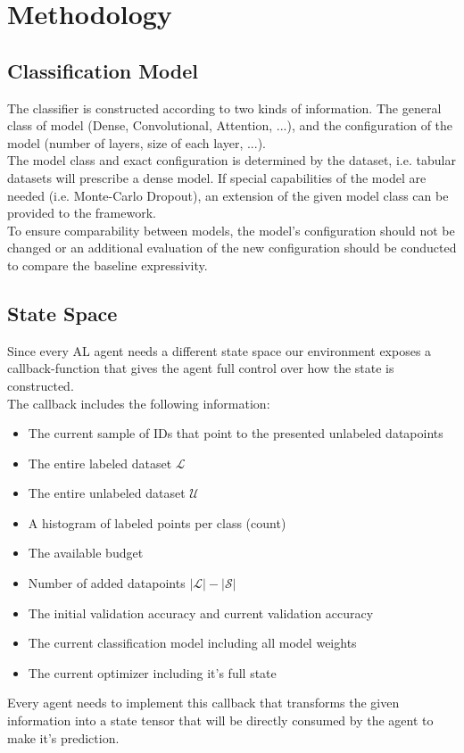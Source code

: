 \documentclass[]{article}
\begin{document}
\section{Methodology}

\subsection{Classification Model}
The classifier is constructed according to two kinds of information.
The general class of model (Dense, Convolutional, Attention, ...), and the configuration of the model (number of layers, size of each layer, ...). \\
The model class and exact configuration is determined by the dataset, i.e. tabular datasets will prescribe a dense model.
If special capabilities of the model are needed (i.e. Monte-Carlo Dropout), an extension of the given model class can be provided to the framework. \\ [1mm]
To ensure comparability between models, the model's configuration should not be changed or an additional evaluation of the new configuration should be conducted to compare the baseline expressivity.

\subsection{State Space}
Since every AL agent needs a different state space our environment exposes a callback-function that gives the agent full control over how the state is constructed. \\ [1mm]
The callback includes the following information:
\begin{itemize}
	\item The current sample of IDs that point to the presented unlabeled datapoints
	\item The entire labeled dataset $\mathcal{L}$
	\item The entire unlabeled dataset $\mathcal{U}$
	\item A histogram of labeled points per class (count)
	\item The available budget
	\item Number of added datapoints $|\mathcal{L}| - |\mathcal{S}|$
	\item The initial validation accuracy and current validation accuracy
	\item The current classification model including all model weights
	\item The current optimizer including it's full state
\end{itemize}
Every agent needs to implement this callback that transforms the given information into a state tensor that will be directly consumed by the agent to make it's prediction.
\end{document}

